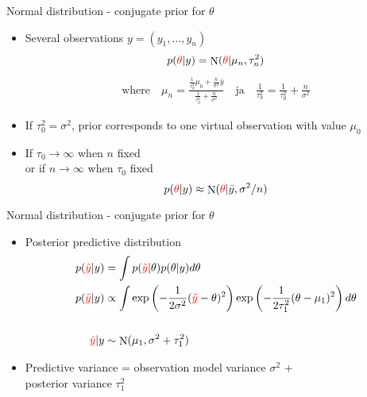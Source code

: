 \documentclass[english,t]{beamer}
\DeclareMathOperator{\N}{N}
\begin{document}
\begin{frame}{Normal distribution - conjugate prior for $\theta$}

  \begin{itemize}
  \item Several observations $y=(y_1,\ldots,y_n)$
    \begin{align*}
      p({\color{red}\theta}|y) = \N({\color{red}\theta}|\mu_n,\tau_n^2)
    \end{align*}
    \vskip -6mm
    \begin{align*}
      \text{where} \quad
      \mu_n=\frac{\frac{1}{\tau_0^2}\mu_0+\frac{n}{\sigma^2}\bar{y}}{\frac{1}{\tau_0^2}+\frac{n}{\sigma^2}} \quad
      \text{ja} \quad \frac{1}{\tau_n^2} = \frac{1}{\tau_0^2}+\frac{n}{\sigma^2}
    \end{align*}
  \item If $\tau_0^2=\sigma^2$, prior corresponds to one virtual observation with value $\mu_0$
    \pause
  \item If $\tau_0\rightarrow\infty$ when $n$ fixed\\
    or if $n\rightarrow\infty$ when $\tau_0$ fixed
    \begin{equation*}
      p({\color{red}\theta}|y) \approx \N({\color{red}\theta}|\bar{y},\sigma^2/n)
    \end{equation*}
  \end{itemize}

\end{frame}

\begin{frame}{Normal distribution - conjugate prior for $\theta$}

  \begin{itemize}
  \item Posterior predictive distribution
    \begin{align*}
      p({\color{red}\tilde{y}}|y)&=\int p({\color{red}\tilde{y}}|\theta)p(\theta|y) d\theta \\
      p({\color{red}\tilde{y}}|y)& \propto\int
                                   \exp\left(-\frac{1}{2\sigma^2}({\color{red}\tilde{y}}-\theta)^2\right)\exp\left(-\frac{1}{2\tau_1^2}(\theta-\mu_1)^2\right) d\theta \\
      ~&~\\ 
      {\color{red}\tilde{y}}|y &\sim \N(\mu_1,\sigma^2+\tau_1^2)
    \end{align*}
  \item Predictive variance = observation model variance $\sigma^2$ + \\
    posterior variance $\tau_1^2$

  \end{itemize}

\end{frame}
\end{document}
